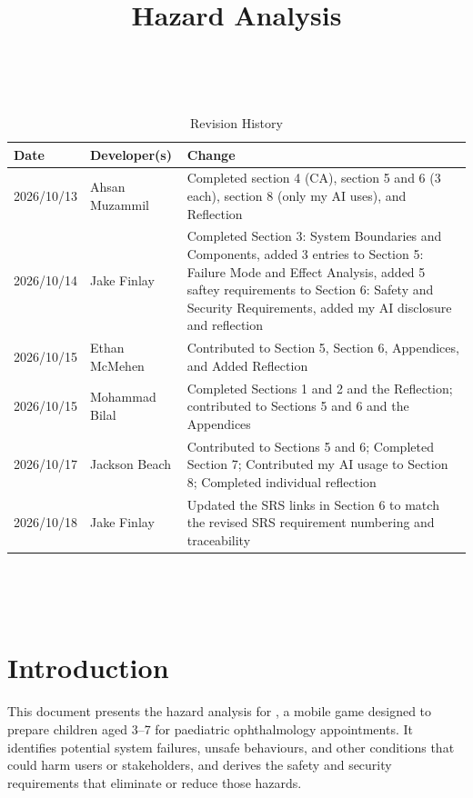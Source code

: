 \documentclass{article}
\title{Hazard Analysis\\\progname}
\author{\authname}
\date{}
\newcounter{hazard}
\begin{document}
\maketitle
\thispagestyle{empty}

~\newpage


\begin{table}[hp]
\caption{Revision History} \label{TblRevisionHistory}
\begin{tabularx}{\textwidth}{llX}
\toprule
\textbf{Date} & \textbf{Developer(s)} & \textbf{Change}\\
\midrule
2026/10/13 & Ahsan Muzammil & Completed section 4 (CA), section 5 and 6 (3 each), section 8 (only my AI uses), and Reflection\\
2026/10/14 & Jake Finlay & Completed Section 3: System Boundaries and
Components, added 3 entries to Section 5: Failure Mode and Effect Analysis,
added 5 saftey requirements to Section 6: Safety and Security Requirements,
added my AI disclosure and reflection \\
2026/10/15 & Ethan McMehen & Contributed to Section 5, Section 6, Appendices, and Added Reflection \\
2026/10/15 & Mohammad Bilal & Completed Sections 1 and 2 and the Reflection; contributed to Sections 5 and 6 and the Appendices \\
2026/10/17 & Jackson Beach & Contributed to Sections 5 and 6; Completed Section 7; Contributed my AI usage to Section 8; Completed individual reflection \\
2026/10/18 & Jake Finlay & Updated the SRS links in Section 6 to match the
revised SRS requirement numbering and traceability \\
\bottomrule
\end{tabularx}
\end{table}

~\newpage

\tableofcontents

~\newpage


\section{Introduction}
\label{sec_Introduction}

This document presents the hazard analysis for \progname{}, a mobile game
designed to prepare children aged 3--7 for paediatric ophthalmology appointments.
It identifies potential system failures, unsafe behaviours, and other
conditions that could harm users or stakeholders,
and derives the safety and security requirements that eliminate or
reduce those hazards.
\end{document}
